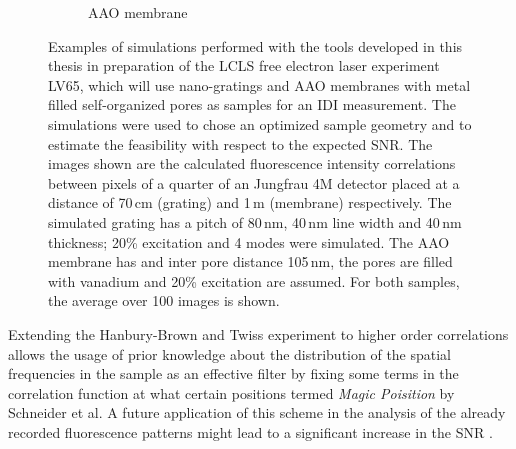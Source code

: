 \begin{figure}
\begin{subfigure}[b]{0.37\textwidth}
		\caption{AAO membrane  }
		\label{fig:outlook_aao}
	\end{subfigure}
	\caption[Simulations in Preparation of LV65 Experiment]{Examples of simulations performed with the tools developed in this thesis in preparation of the LCLS free electron laser experiment LV65, which will use nano-gratings and AAO membranes with metal filled self-organized pores as samples for an IDI measurement. The simulations were used to chose an optimized sample geometry and to estimate the feasibility with respect to the expected SNR. The images shown are the calculated fluorescence intensity correlations between pixels of a quarter of an Jungfrau 4M detector placed at a distance of 70\,cm (grating) and 1\,m (membrane) respectively. The simulated grating has a pitch of 80\,nm, 40\,nm line width and 40\,nm thickness; 20\% excitation and 4 modes were simulated. The AAO membrane has and inter pore distance 105\,nm, the pores are filled with vanadium and 20\% excitation are assumed. For both samples, the average over 100 images is shown.}
\end{figure}



Extending the Hanbury-Brown and Twiss experiment to higher order correlations allows the usage of prior knowledge about the distribution of the spatial frequencies in the sample as an effective filter by fixing some terms in the correlation function at what certain positions termed  \textit{Magic Poisition} by Schneider et al. A future application of this scheme in the analysis of the already recorded fluorescence patterns might lead to a significant increase in the SNR \cite{schneider2018}.
